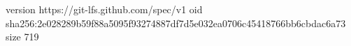 version https://git-lfs.github.com/spec/v1
oid sha256:2e028289b59f88a5095f93274887df7d5e032ea0706c45418766bb6cbdac6a73
size 719
